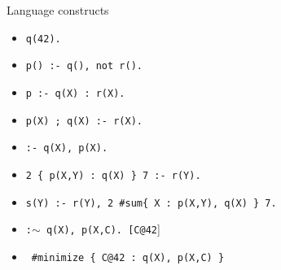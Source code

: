 \begin{frame}[fragile]{Language constructs}
  \bigskip
  \begin{itemize}\itemsep 5pt
  \item<2->                  \hfill\alert<1>{\texttt{q(42).}}
  \item<2->                  \hfill\alert<1>{\texttt{p(\alt<3>{42}{X}) :- q(\alt<3>{42}{X}), not r().}}
  \item<4->   \hfill\texttt{p :- \alert<4>{q(X) : r(X)}.}
  \item<5->            \hfill\texttt{\alert<5>{p(X) ; q(X)} :- r(X).}
  \item<6->  \hfill\texttt{\alert<6>{:- q(X), p(X)}.}
  \item<7->                 \hfill\texttt{\alert<7>{2 \{ p(X,Y) : q(X) \} 7} :- r(Y).}
  \item<8->             \hfill\texttt{s(Y) :- r(Y), \alert<8>{2 \#sum\{ X : p(X,Y), q(X) \} 7}.}
    \bigskip
  \item<9->  \hfill\alert<9>{\texttt{:$\mathtt{\sim}$ q(X), p(X,C). [C\alert{@42}}]}
  \item<10->[]\ \hfill\alert<10>{\texttt{\#minimize \{ C@42 : q(X), p(X,C) \}}}
\end{itemize}
\end{frame}
%
